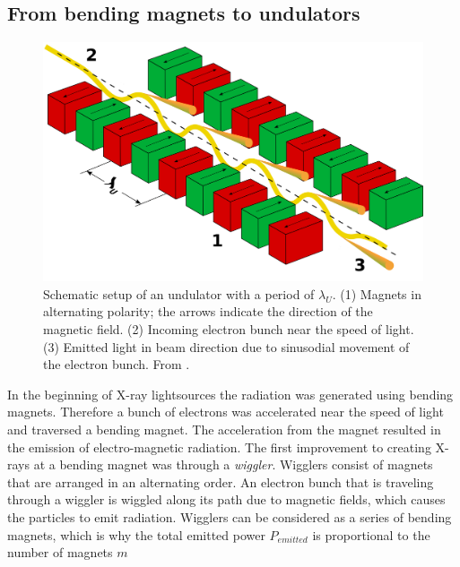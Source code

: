 \subsection{From bending magnets to undulators}\label{sec:undulator}
\begin{figure}[t]
	\centering
		\includegraphics[width=1.00\textwidth]{images/Undulator.png}
	\caption[Schematic setup of an undulator.]{Schematic setup of an undulator with a period of $\lambda_{U}$. (1) Magnets in alternating polarity; the arrows indicate the direction of the magnetic field. (2) Incoming electron bunch near the speed of light. (3) Emitted light in beam direction due to sinusodial movement of the electron bunch. From \cite{holst-2005-wiki}.}
	\label{fig:undulator}
\end{figure}
In the beginning of X-ray lightsources the radiation was generated using bending magnets. Therefore a bunch of electrons was accelerated near the speed of light and traversed a bending magnet. The acceleration from the magnet resulted in the emission of electro-magnetic radiation. The first improvement to creating X-rays at a bending magnet was through a \textit{wiggler}. Wigglers consist of magnets that are arranged in an alternating order. An electron bunch that is traveling through a wiggler is wiggled along its path due to magnetic fields, which causes the particles to emit radiation. Wigglers can be considered as a series of bending magnets, which is why the total emitted power $P_{emitted}$ is proportional to the number of magnets $m$ \citep{Brown-1983-NIMPR}
